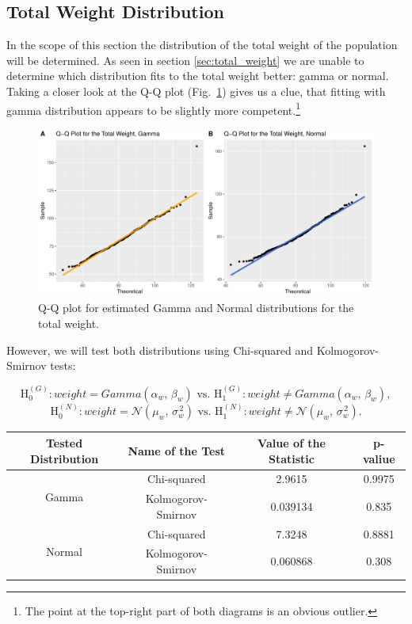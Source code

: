 \documentclass[11pt,american,american]{article}
\begin{document}
\subsection{Total Weight Distribution}

In the scope of this section the distribution of the total weight of the population will be determined. As seen in section \ref{sec:total_weight} we are unable to determine which distribution fits to the total weight better: gamma or normal. Taking a closer look at the Q-Q plot (Fig.~\ref{fig:qq_total_weight}) gives us a clue, that fitting with gamma distribution appears to be slightly more competent.\footnote{The point at the top-right part of both diagrams is an obvious outlier.} 

\begin{figure}[H]
	\centering
	\includegraphics[width=0.9\linewidth]{Images/FIGURES/qq_total_weight}
	\caption{Q-Q plot for estimated Gamma and Normal distributions for the total weight.}
	\label{fig:qq_total_weight}
\end{figure}

However, we will test both distributions using Chi-squared and Kolmogorov-Smirnov tests:

\begin{equation*}
\text{H}_{0}^{(G)}: weight = Gamma(\alpha_{w}, \, \beta_{w}) \text{ vs. }
\text{H}_{1}^{(G)}: weight \neq Gamma(\alpha_{w}, \, \beta_{w}),
\end{equation*}
\begin{equation*}
\text{H}_{0}^{(N)}: weight = \mathcal{N} (\mu_{w},\,\sigma^{\,2}_{w}) \text{ vs. }
\text{H}_{1}^{(N)}: weight \neq \mathcal{N} (\mu_{w},\,\sigma^{\,2}_{w}).
\end{equation*}

\begin{table}[ht!]
	\centering
	\begin{tabular}{|c||c||c|c|}
		\hline 
		Tested Distribution & Name of the Test & Value of the Statistic & p-valiue \\ 
		\hline \hline
		\multirow{2}{*}{Gamma} & Chi-squared & 2.9615 & 0.9975 \\ 
		\cline{2-4} 
		& Kolmogorov-Smirnov & 0.039134 & 0.835 \\ 
		\hline \hline
		\multirow{2}{*}{Normal} & Chi-squared & 7.3248 & 0.8881 \\ 
		\cline{2-4} 
		& Kolmogorov-Smirnov & 0.060868 & 0.308 \\ 
		\hline
	\end{tabular} 
\end{table}
\end{document}
